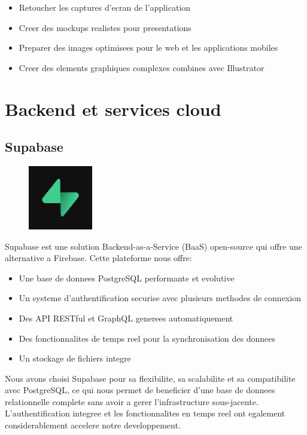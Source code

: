 \begin{itemize}
    \item Retoucher les captures d'ecran de l'application
    \item Creer des mockups realistes pour presentations
    \item Preparer des images optimisees pour le web et les applications mobiles
    \item Creer des elements graphiques complexes combines avec Illustrator
\end{itemize}

\section{Backend et services cloud}

\subsection{Supabase}
\begin{figure}
    \centering
    \includegraphics[width=0.25\textwidth]{assets/docs/logo_supabase.png}
\end{figure}
Supabase est une solution Backend-as-a-Service (BaaS) open-source qui offre une alternative a Firebase. Cette plateforme nous offre:

\begin{itemize}
    \item Une base de donnees PostgreSQL performante et evolutive
    \item Un systeme d'authentification securise avec plusieurs methodes de connexion
    \item Des API RESTful et GraphQL generees automatiquement
    \item Des fonctionnalites de temps reel pour la synchronisation des donnees
    \item Un stockage de fichiers integre
\end{itemize}

Nous avons choisi Supabase pour sa flexibilite, sa scalabilite et sa compatibilite avec PostgreSQL, ce qui nous permet de beneficier d'une base de donnees relationnelle complete sans avoir a gerer l'infrastructure sous-jacente. L'authentification integree et les fonctionnalites en temps reel ont egalement considerablement accelere notre developpement.

